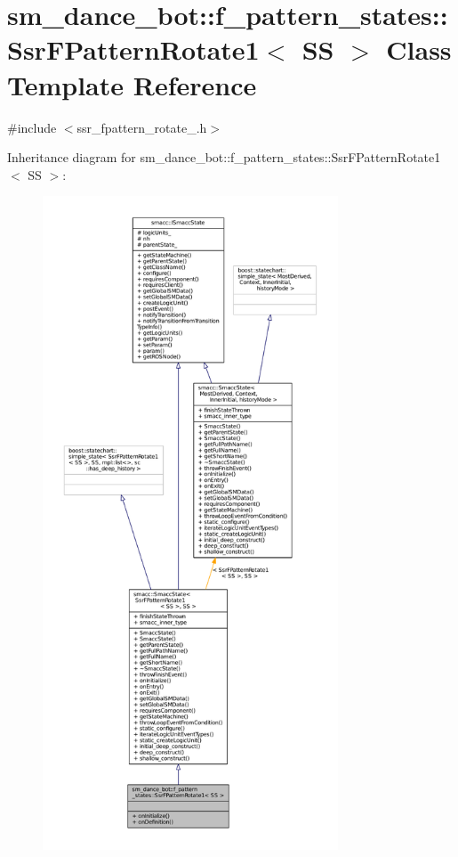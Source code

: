 \hypertarget{structsm__dance__bot_1_1f__pattern__states_1_1SsrFPatternRotate1}{}\section{sm\+\_\+dance\+\_\+bot\+:\+:f\+\_\+pattern\+\_\+states\+:\+:Ssr\+F\+Pattern\+Rotate1$<$ SS $>$ Class Template Reference}
\label{structsm__dance__bot_1_1f__pattern__states_1_1SsrFPatternRotate1}


{\ttfamily \#include $<$ssr\+\_\+fpattern\+\_\+rotate\+\_.\+h$>$}



Inheritance diagram for sm\+\_\+dance\+\_\+bot\+:\+:f\+\_\+pattern\+\_\+states\+:\+:Ssr\+F\+Pattern\+Rotate1$<$ SS $>$\+:
\nopagebreak
\begin{figure}[H]
\begin{center}
\leavevmode
\includegraphics[height=550pt]{structsm__dance__bot_1_1f__pattern__states_1_1SsrFPatternRotate1__inherit__graph}
\end{center}
\end{figure}


